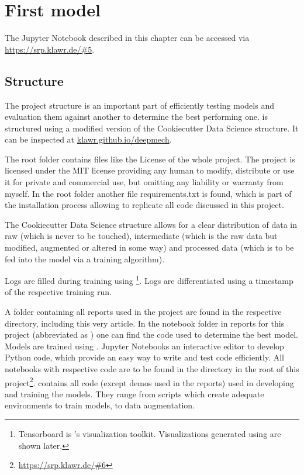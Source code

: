 \section{First model}

The Jupyter Notebook described in this chapter can be accessed via \url{https://srp.klawr.de/\#5}.

\subsection{Structure}
The project structure is an important part of efficiently testing models and evaluation them against another to determine the best performing one.
 is structured using a modified version of the Cookiecutter Data Science \cite{drivendata2019} structure. It can be inspected at \url{klawr.github.io/deepmech}.

The root folder contains files like the License of the whole project.
The project is licensed under the MIT license providing any human to modify, distribute or use it for private and commercial use, but omitting any liability or warranty from myself.
In the root folder another file requirements.txt is found, which is part of the installation process allowing to replicate all code discussed in this project.

The Cookiecutter Data Science structure allows for a clear distribution of data in raw (which is never to be touched), intermediate (which is the raw data but modified, augmented or altered in some way) and processed data (which is to be fed into the model via a training algorithm).

Logs are filled during training using \footnote{Tensorboard is 's visualization toolkit. Visualizations generated using  are shown later.}. Logs are differentiated using a timestamp of the respective training run.


A folder containing all reports used in the project are found in the respective directory, including this very article.
In the notebook folder in reports for this project (abbreviated as ) one can find the code used to determine the best model.
Models are trained using  \cite{Jupyter2019}.
Jupyter Notebooks an interactive editor to develop Python code, which provide an easy way to write and test code efficiently.
All notebooks with respective code are to be found in the  directory in the root of this project\footnote{\url{https://srp.klawr.de/\#6}}.
 contains all code (except demos used in the reports) used in developing and training the models. They range from scripts which create adequate environments to train models, to data augmentation.

